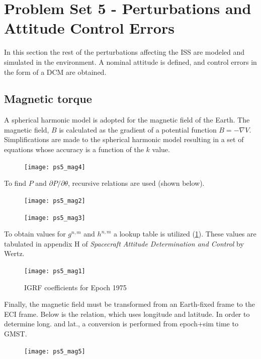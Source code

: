\documentclass[12pt, letterpaper]{article}
\begin{document}
\section{Problem Set 5 - Perturbations and Attitude Control Errors}

In this section the rest of the perturbations affecting the ISS are modeled and simulated in the environment. A nominal attitude is defined, and control errors in the form of a DCM are obtained.

\subsection{Magnetic torque}

A spherical harmonic model is adopted for the magnetic field of the Earth. The magnetic field, $B$ is calculated as the gradient of a potential function $B=-\nabla V$. Simplifications are made to the spherical harmonic model resulting in a set of equations whose accuracy is a function of the $k$ value.

\begin{figure}[H]
	\centering
	\texttt{[image: ps5\_mag4]}
\end{figure}

To find $P$ and $\partial P/\partial\theta$, recursive relations are used (shown below).

\begin{figure}[H]
	\centering
	\texttt{[image: ps5\_mag2]}
\end{figure}

\begin{figure}[H]
	\centering
	\texttt{[image: ps5\_mag3]}
\end{figure}


To obtain values for $g^{n,m}$ and $h^{n,m}$ a lookup table is utilized (\ref{5:mag1}). These values are tabulated in appendix H of \textit{Spacecraft Attitude Determination and Control} by Wertz.

\begin{figure}[H]
	\centering
	\texttt{[image: ps5\_mag1]}
	\caption{IGRF coefficients for Epoch 1975}
	\label{5:mag1}
\end{figure}

Finally, the magnetic field must be transformed from an Earth-fixed frame to the ECI frame. Below is the relation, which uses longitude and latitude. In order to determine long. and lat., a conversion is performed from epoch+sim time to GMST.

\begin{figure}[H]
	\centering
	\texttt{[image: ps5\_mag5]}
\end{figure}
\end{document}
